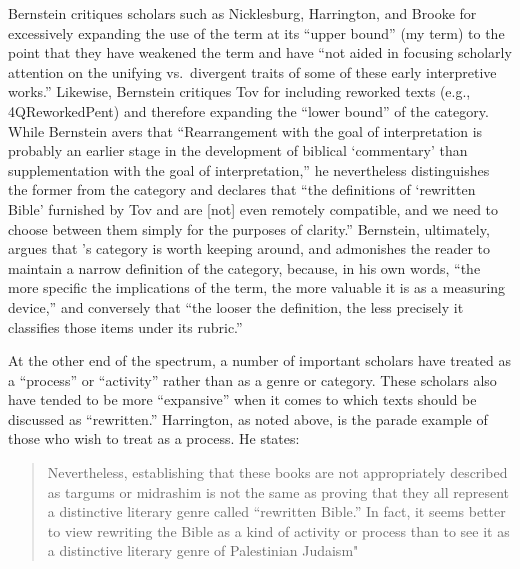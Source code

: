  Bernstein critiques scholars such as Nicklesburg,\autocite{nickelsburg_stone1984} Harrington,\autocite{harrington_kraft-nickelsburg1986} and Brooke\autocite{brooke_schiffman-vanderkam2000} for excessively expanding the use of the term \rwb at its ``upper bound'' (my term) to the point that they have weakened the term and have ``not aided in focusing scholarly attention on the unifying vs.~divergent traits of some of these early interpretive works.''\autocite[179]{bernstein_textus2005} Likewise, Bernstein critiques Tov for including reworked texts (e.g., 4QReworkedPent) and therefore expanding the ``lower bound'' of the category. While Bernstein avers that ``Rearrangement with the goal of interpretation is probably an earlier stage in the development of biblical `commentary' than supplementation with the goal of interpretation,''\autocite[PAGE]{bernstein_textus2005} he nevertheless distinguishes the former from the category \rwb and declares that ``the definitions of `rewritten Bible' furnished by Tov and \vermes are {[}not{]} even remotely compatible, and we need to choose between them simply for the purposes of clarity.''\autocite[185]{bernstein_textus2005} Bernstein, ultimately, argues that \vermes's category is worth keeping around, and admonishes the reader to maintain a narrow definition of the category, because, in his own words, ``the more specific the implications of the term, the more valuable it is as a measuring device,''\autocite[195]{bernstein_textus2005} and conversely that ``the looser the definition, the less precisely it classifies those items under its rubric.'' \autocite[195]{bernstein_textus2005} 

 At the other end of the spectrum, a number of important scholars have treated \rwb as a ``process'' or ``activity'' rather than as a genre or category. These scholars also have tended to be more ``expansive'' when it comes to which texts should be discussed as ``rewritten.'' Harrington, as noted above, is the parade example of those who wish to treat \rwb as a process. He states: 

 \begin{quote} Nevertheless, establishing that these books are not appropriately described as targums or midrashim is not the same as proving that they all represent a distinctive literary genre called ``rewritten Bible.'' In fact, it seems better to view rewriting the Bible as a kind of activity or process than to see it as a distinctive literary genre of Palestinian Judaism"\autocite[242--243]{harrington_kraft-nickelsburg1986} \end{quote} 

